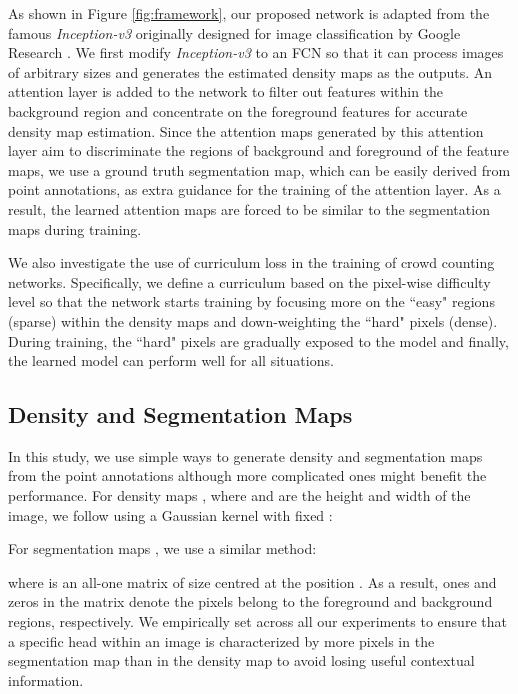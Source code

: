 \documentclass[journal,comsoc]{IEEEtran}
\begin{document}
As shown in Figure \ref{fig:framework}, our proposed network is adapted from the famous \textit{Inception-v3} originally designed for image classification by Google Research \cite{szegedy2016rethinking}. We first modify \textit{Inception-v3} to an FCN so that it can process images of arbitrary sizes and generates the estimated density maps  as the outputs. An attention layer is added to the network to filter out features within the background region and concentrate on the foreground features for accurate density map estimation. Since the attention maps generated by this attention layer aim to discriminate the regions of background and foreground of the feature maps, we use a ground truth segmentation map,  which can be easily derived from point annotations, as extra guidance for the training of the attention layer. As a result, the learned attention maps are forced to be similar to the segmentation maps during training. 

We also investigate the use of curriculum loss in the training of crowd counting networks. Specifically, we define a curriculum based on the pixel-wise difficulty level so that the network starts training by focusing more on the ``easy" regions (sparse) within the density maps and down-weighting the ``hard" pixels (dense). During training, the ``hard" pixels are gradually exposed to the model and finally, the learned model can perform well for all situations.

\subsection{Density and Segmentation Maps} \label{sec:segMap}
In this study, we use simple ways to generate density and segmentation maps from the point annotations although more complicated ones \cite{shi2019counting} might benefit the performance. For density maps , where  and  are the height and width of the image, we follow \cite{zhang2016single} using a Gaussian kernel  with fixed :


For segmentation maps , we use a similar method:

where  is an all-one matrix of size  centred at the position . As a result, ones and zeros in the matrix  denote the pixels belong to the foreground and background regions, respectively. We empirically set  across all our experiments to ensure that a specific head within an image is characterized by more pixels in the segmentation map than in the density map to avoid losing useful contextual information.
\end{document}
